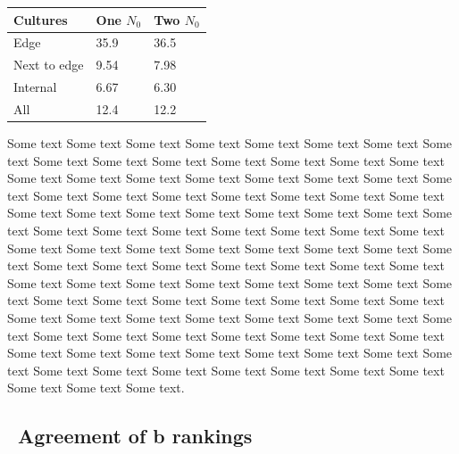 \begin{multicols}{2}


\columnbreak
\begin{center}
  \begin{tabular}{l l l}
    \hline
    Cultures     & One \(N_{0}\)  & Two \(N_{0}\) \\
    \hline
    Edge         & 35.9    & 36.5\\
    Next to edge & 9.54    & 7.98\\
    Internal     & 6.67    & 6.30\\
    All          & 12.4    & 12.2\\
    \hline
  \end{tabular}
  \label{tab:corner}
\end{center}



  Some text Some text Some text Some text Some text Some text Some
  text Some text Some text Some text Some text Some text Some text
  Some text Some text Some text Some text Some text Some text Some
  text Some text Some text Some text Some text Some text Some text
  Some text Some text Some text Some text Some text Some text Some
  text Some text Some text Some text Some text Some text Some text
  Some text Some text Some text Some text Some text Some text Some
  text Some text Some text Some text Some text Some text Some text
  Some text Some text Some text Some text Some text Some text Some
  text Some text Some text Some text Some text Some text Some text
  Some text Some text Some text Some text Some text Some text Some
  text Some text Some text Some text Some text Some text Some text
  Some text Some text Some text Some text Some text Some text Some
  text Some text Some text Some text Some text Some text Some text
  Some text Some text Some text Some text Some text Some text Some
  text Some text Some text Some text Some text Some text Some text
  Some text Some text Some text Some text.

\subsection{\thesubsection~Agreement of b rankings}


\end{multicols}
